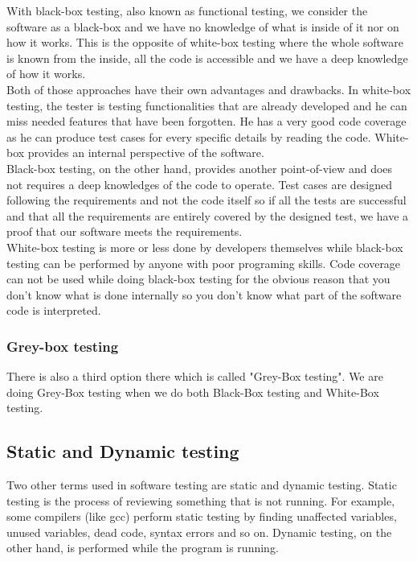 \documentclass[12pt]{article}
\begin{document}
With black-box testing, also known as functional testing, we consider the software as a black-box and we have no knowledge of what is inside of it nor on how it works. This is the opposite of white-box testing where the whole software is known from the inside, all the code is accessible and we have a deep knowledge of how it works.\\

Both of those approaches have their own advantages and drawbacks. In white-box testing, the tester is testing functionalities that are already developed and he can miss needed features that have been forgotten. He has a very good code coverage as he can produce test cases for every specific details by reading the code. White-box provides an internal perspective of the software.\\

Black-box testing, on the other hand, provides another point-of-view and does not requires a deep knowledges of the code to operate. Test cases are designed following the requirements and not the code itself so if all the tests are successful and that all the requirements are entirely covered by the designed test, we have a proof that our software meets the requirements.\\

White-box testing is more or less done by developers themselves while black-box testing can be performed by anyone with poor programing skills. Code coverage can not be used while doing black-box testing for the obvious reason that you don't know what is done internally so you don't know what part of the software code is interpreted.

\subsubsection{Grey-box testing}

There is also a third option there which is called "Grey-Box testing". We are doing Grey-Box testing when we do both Black-Box testing and White-Box testing.

\subsection{Static and Dynamic testing}

Two other terms used in software testing are static and dynamic testing. Static testing is the process of reviewing something that is not running. For example, some compilers (like gcc) perform static testing by finding unaffected variables, unused variables, dead code, syntax errors and so on. Dynamic testing, on the other hand, is performed while the program is running.
\end{document}
